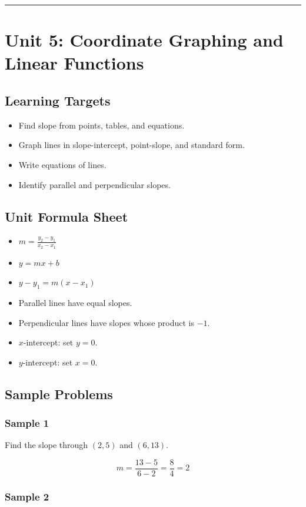 \documentclass[11pt]{book}
\begin{document}
\bigskip\hrule\bigskip

\chapter{Unit 5: Coordinate Graphing and Linear Functions}

\section{Learning Targets}

\begin{itemize}
\item Find slope from points, tables, and equations.
\item Graph lines in slope-intercept, point-slope, and standard form.
\item Write equations of lines.
\item Identify parallel and perpendicular slopes.
\end{itemize}

\section{Unit Formula Sheet}

\begin{itemize}
\item \(m=\frac{y_2-y_1}{x_2-x_1}\)
\item \(y=mx+b\)
\item \(y-y_1=m(x-x_1)\)
\item Parallel lines have equal slopes.
\item Perpendicular lines have slopes whose product is \(-1\).
\item \(x\)-intercept: set \(y=0\).
\item \(y\)-intercept: set \(x=0\).
\end{itemize}

\section{Sample Problems}

\subsection{Sample 1}

Find the slope through \((2,5)\) and \((6,13)\).

\[m=\frac{13-5}{6-2}=\frac84=2\]

\subsection{Sample 2}
\end{document}
